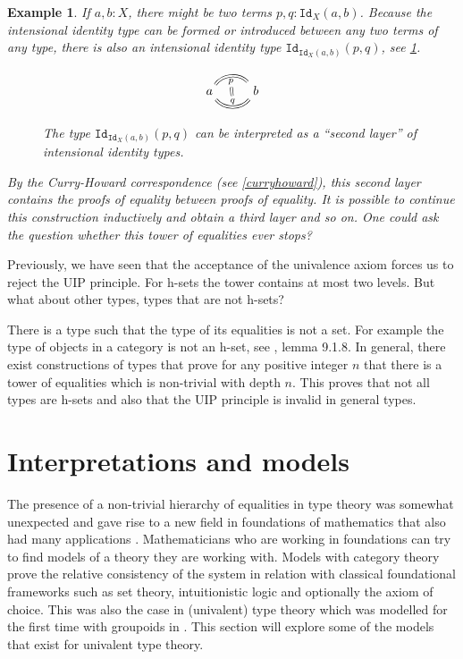\documentclass[11pt,a4paper,twoside,xetex,draft]{book}
\newtheorem{example}[theorem]{Example}
\newcommand{\op}[1]{\mathtt{#1}}
\begin{document}
\begin{example}\label{stackedeqs}
If $a,b:X$, there might be two terms $p,q:\op{Id}_X(a,b)$. Because the intensional identity type can be formed or introduced between any two terms of any type, there is also an intensional identity type $\op{Id}_{\op{Id}_X(a,b)}(p,q)$, see \cref{secondleveleq}. 


\begin{figure}\label{secondleveleq}
 \centering
 
\[ \begin{tikzcd}
a \arrow[equal, r, bend left=50, "p"{name=U, below}]
\arrow[equal, r, bend right=50, "q"{name=D}]
& b
\arrow[equal, r, from=U, to=D]
\end{tikzcd}
\]
 \caption{The type $\op{Id}_{\op{Id}_X(a,b)}(p,q)$ can be interpreted as a ``second layer'' of intensional identity types. }
\end{figure}


By the Curry-Howard correspondence (see \cref{curryhoward}), this second layer contains the proofs of equality between proofs of equality. It is possible to continue this construction inductively and obtain a third layer and so on. One could ask the question whether this tower of equalities ever stops? 
\end{example}




Previously, we have seen that the acceptance of the univalence axiom forces us to reject the UIP principle. For h-sets the tower contains at most two levels. But what about other types, types that are not h-sets? 

There is a type such that the type of its equalities is not a set. For example the type of objects in a category is not an h-set, see \cite{Voevodsky2013}, lemma 9.1.8. In general, there exist constructions of types that prove for any positive integer $n$ that there is a tower of equalities which is non-trivial with depth $n$. This proves that not all types are h-sets and also that the UIP principle is invalid in general types. 



\chapter{Interpretations and models}

The presence of a non-trivial hierarchy of equalities in type theory was somewhat unexpected and gave rise to a new field in foundations of mathematics that also had many applications \cite{Voevodsky2013}. Mathematicians who are working in foundations can try to find models of a theory they are working with. Models with category theory prove the relative consistency of the system in relation with classical foundational frameworks such as set theory, intuitionistic logic and optionally the axiom of choice. This was also the case in (univalent) type theory which was modelled for the first time with groupoids in \cite{Hofmann1998}. This section will explore some of the models that exist for univalent type theory.
\end{document}
